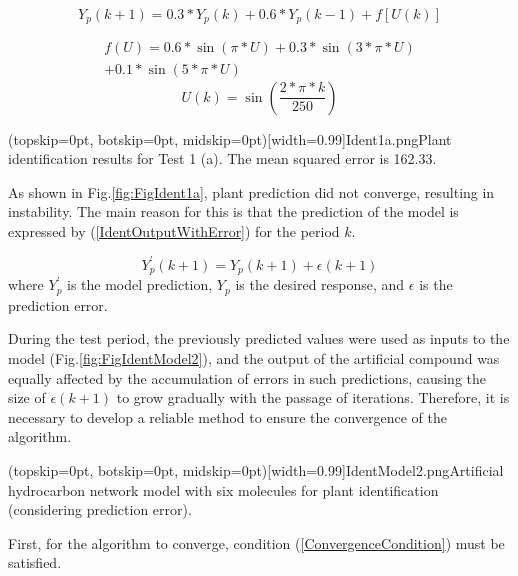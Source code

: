 \documentclass{ieeeaccess}
\begin{document}
\begin{equation}\label{IdentTest1aEquation1}
Y_p(k+1)=0.3\ast Y_p(k)+0.6\ast Y_p(k-1) + f[U(k)]
\end{equation}

\begin{equation}\label{IdentTest1aEquation2}
\begin{matrix}
f\left(U\right)=0.6\ast\sin{\left(\pi\ast U\right)}+0.3\ast\sin{\left(3\ast\pi\ast U\right)}\\
+0.1\ast\sin{\left(5\ast\pi\ast U\right)}
\end{matrix}
\end{equation}
\begin{equation}\label{IdentTest1aEquation3}
U\left(k\right)=\sin{\left(\frac{2\ast\pi\ast k}{250}\right)}
\end{equation}

\Figure[ht!](topskip=0pt, botskip=0pt, midskip=0pt)[width=0.99\columnwidth]{Ident1a.png}{Plant identification results for Test 1 (a). The mean squared error is 162.33\label{fig:FigIdent1a}.}

As shown in Fig.\ref{fig:FigIdent1a}, plant prediction did not converge, resulting in instability. The main reason for this is that the prediction of the model is expressed by (\ref{IdentOutputWithError}) for the period \(k\).

\begin{equation}\label{IdentOutputWithError}
Y_p^\prime\left(k+1\right)=Y_p\left(k+1\right)+\epsilon(k+1)
\end{equation}
where \(Y_p^\prime\) is the model prediction, \(Y_p\) is the desired response, and \(\epsilon\) is the prediction error.

During the test period, the previously predicted values were used as inputs to the model (Fig.\ref{fig:FigIdentModel2}), and the output of the artificial compound was equally affected by the accumulation of errors in such predictions, causing the size of \(\epsilon(k+1)\) to grow gradually with the passage of iterations. Therefore, it is necessary to develop a reliable method to ensure the convergence of the algorithm. 

\Figure[ht!](topskip=0pt, botskip=0pt, midskip=0pt)[width=0.99\columnwidth]{IdentModel2.png}{Artificial hydrocarbon network model with six molecules for plant identification (considering prediction error)\label{fig:FigIdentModel2}.}

First, for the algorithm to converge, condition (\ref{ConvergenceCondition}) must be satisfied.
\end{document}
